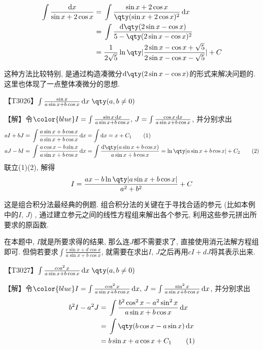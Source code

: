 \documentclass{ctexbook}
\newcommand*{\dif}{\mathop{}\!\mathrm{d}}
\begin{document}
{\begin{align*}
\int\frac{\dif{x}}{\sin{x}+2\cos{x}}={}&\int\frac{\sin{x}+2\cos{x}}{\qty(\sin{x}+2\cos{x})^{2}}\dif{x}\\
={}&\int\frac{\dif{\qty(2\sin{x}-\cos{x})}}{5-\qty(2\sin{x}-\cos{x})^{2}}\\
={}&\frac{1}{2\sqrt{5}}\ln\qty|\frac{2\sin{x}-\cos{x}+\sqrt{5}}{2\sin{x}-\cos{x}-\sqrt{5}}|+C
\end{align*}\par
{\kaishu 这种方法比较特别, 是通过构造凑微分$\dif{\qty(2\sin{x}-\cos{x})}$的形式来解决问题的. 这里也体现了一点整体凑微分的思想. \par}
{\color{red}【T3026】}$\int\frac{\sin{x}}{a\sin{x}+b\cos{x}}\dif{x}\;\qty(a,b\ne0)$\par
【解】令$\color{blue}I=\int\frac{\sin{x}\dif{x}}{a\sin{x}+b\cos{x}},\,J=\int\frac{\cos{x}\dif{x}}{a\sin{x}+b\cos{x}}$, 并分别求出
\begin{align*}
aI+bJ={}&\int\frac{a\sin{x}+b\cos{x}}{a\sin{x}+b\cos{x}}\dif{x}=\int\dif{x}=x+C_{1}\tag{1}\\
aJ-bI={}&\int\frac{a\cos{x}-b\sin{x}}{a\sin{x}+b\cos{x}}\dif{x}
=\int\frac{\dif{\qty(a\sin{x}+b\cos{x})}}{a\sin{x}+b\cos{x}}
=\ln\qty|a\sin{x}+b\cos{x}|+C_{2}\tag{2}
\end{align*}
联立(1)(2), 解得
\begin{align*}
I=\frac{ax-b\ln\qty|a\sin{x}+b\cos{x}|}{a^{2}+b^{2}}+C
\end{align*}\par
{\kaishu 这是组合积分法最经典的例题. 组合积分法的关键在于寻找合适的参元 (比如本例中的$I,\,J$) , 通过建立参元之间的线性方程组来解出各个参元, 利用这些参元拼出所要求的原函数. \par
在本题中, $I$就是所要求得的结果, 那么连$J$都不需要求了, 直接使用消元法解方程组即可. 但倘若要求$\int\frac{c\sin{x}+d\cos{x}}{a\sin{x}+b\cos{x}}$, 就需要在求出$I,\,J$之后再用$cI+dJ$将其表示出来. \par}
{\color{red}【T3027】}$\int\frac{\cos^{2}{x}}{a\sin{x}+b\cos{x}}\dif{x}\;\qty(a,b\ne0)$\par
【解】令$\color{blue}I=\int\frac{\cos^{2}{x}}{a\sin{x}+b\cos{x}}\dif{x},\,J=\int\frac{\sin^{2}{x}}{a\sin{x}+b\cos{x}}\dif{x}$, 并分别求出
\begin{align*}
b^{2}I-a^{2}J={}&\int\frac{b^{2}\cos^{2}{x}-a^{2}\sin^{2}{x}}{a\sin{x}+b\cos{x}}\dif{x}\\
={}&\int\qty(b\cos{x}-a\sin{x})\dif{x}\\
={}&b\sin{x}+a\cos{x}+C_{1}\tag{1}\\
\\

\end{align*}}
\end{document}

